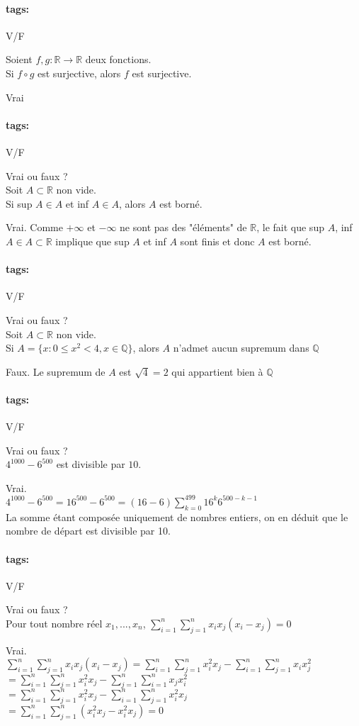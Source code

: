 \documentclass[12pt]{article}
\newcommand*{\xfield}[1]{\begin{mdframed}\centering #1\end{mdframed}\bigskip}
\newenvironment{note}{}{}
\newcommand*{\tags}[1]{\paragraph{tags: }#1}
\begin{document}
\begin{note}
\tags{V/F}
	\xfield{Soient $f, g : \mathbb{R} \to \mathbb{R}$ deux fonctions.\\
	Si $f \circ g$ est surjective, alors $f$ est surjective.}
	\xfield{Vrai}
\end{note}

\begin{note}
\tags{V/F}
	\xfield{Vrai ou faux ?\\
	Soit $A \subset \mathbb{R}$ non vide.\\
	Si sup $A \in A$ et inf $A \in A$, alors $A$ est borné.}
	\xfield{Vrai. Comme $+\infty$ et $-\infty$ ne sont pas des "éléments" de $\mathbb{R}$, le fait que sup $A$, inf $A \in A \subset \mathbb{R}$ implique que sup $A$ et inf $A$ sont finis et donc $A$ est borné.}
\end{note}

\begin{note}
\tags{V/F}
	\xfield{Vrai ou faux ?\\
	Soit $A \subset \mathbb{R}$ non vide.\\
	Si $A = \{x:0 \le x^2 < 4, x \in \mathbb{Q}\}$, alors $A$ n'admet aucun supremum dans $\mathbb{Q}$}
	\xfield{Faux. Le supremum de $A$ est $\sqrt{4} = 2$ qui appartient bien à $\mathbb{Q}$}
\end{note}

\begin{note}
\tags{V/F}
	\xfield{Vrai ou faux ?\\
	$4^1000 - 6^500$ est divisible par $10$.}
	\xfield{Vrai.\\
	$4^1000 - 6^500 = 16^500 - 6^500 = (16-6) \sum\limits^{499}_{k=0}16^k 6^{500-k-1}$\\
	La somme étant composée uniquement de nombres entiers, on en déduit que le nombre de départ est divisible par 10.}
\end{note}

\begin{note}
\tags{V/F}
	\xfield{Vrai ou faux ?\\
	Pour tout nombre réel $x_1,...,x_n$, $\sum\limits^{n}_{i=1} \sum\limits^{n}_{j=1} x_i x_j (x_i-x_j) = 0$}
	\xfield{Vrai.\\
	$\sum\limits^{n}_{i=1} \sum\limits^{n}_{j=1} x_i x_j (x_i-x_j) = \sum\limits^{n}_{i=1} \sum\limits^{n}_{j=1} x_i^2 x_j - \sum\limits^{n}_{i=1} \sum\limits^{n}_{j=1} x_i x_j^2 $\\
	$=\sum\limits^{n}_{i=1} \sum\limits^{n}_{j=1} x_i^2 x_j - \sum\limits^{n}_{j=1} \sum\limits^{n}_{i=1} x_j x_i^2 $\\
	$=\sum\limits^{n}_{i=1} \sum\limits^{n}_{j=1} x_i^2 x_j - \sum\limits^{n}_{i=1} \sum\limits^{n}_{j=1} x_i^2 x_j $\\
	$= \sum\limits^{n}_{i=1} \sum\limits^{n}_{j=1} (x_i^2 x_j - x_i^2 x_j) = 0$
	}
\end{note}
\end{document}
